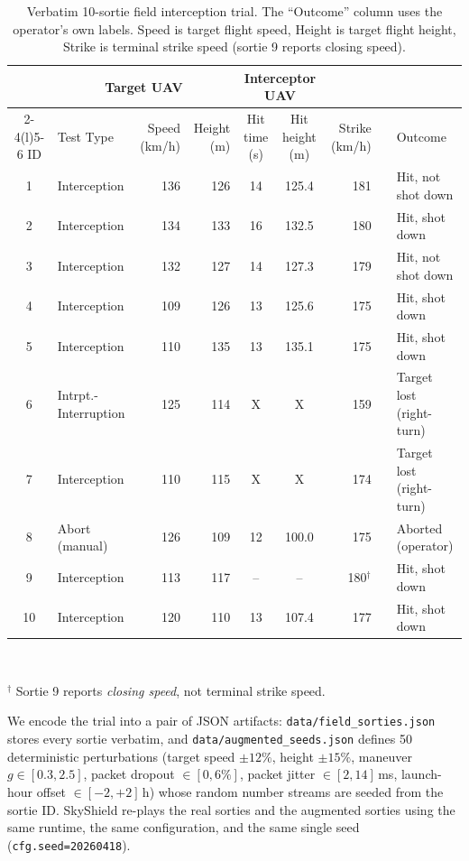 \documentclass[conference]{IEEEtran}
\begin{document}
\begin{table}[t]
\centering
\caption{Verbatim 10-sortie field interception trial.  The ``Outcome'' column
uses the operator's own labels.  Speed is target flight speed, Height is
target flight height, Strike is terminal strike speed (sortie 9 reports
closing speed).}
\label{tab:field}
\small
\begin{tabular}{cl rr cc rr l}
\toprule
 & \multicolumn{3}{c}{Target UAV} & \multicolumn{2}{c}{Interceptor UAV} & & &\\
\cmidrule(l){2-4}\cmidrule(l){5-6}
ID & Test Type & Speed (km/h) & Height (m) & Hit time (s) & Hit height (m)
   & Strike (km/h) & & Outcome\\
\midrule
 1 & Interception         & 136 & 126 & 14 & 125.4 & 181 & & Hit, not shot down\\
 2 & Interception         & 134 & 133 & 16 & 132.5 & 180 & & Hit, shot down\\
 3 & Interception         & 132 & 127 & 14 & 127.3 & 179 & & Hit, not shot down\\
 4 & Interception         & 109 & 126 & 13 & 125.6 & 175 & & Hit, shot down\\
 5 & Interception         & 110 & 135 & 13 & 135.1 & 175 & & Hit, shot down\\
 6 & Intrpt.-Interruption & 125 & 114 &  X &   X   & 159 & & Target lost (right-turn)\\
 7 & Interception         & 110 & 115 &  X &   X   & 174 & & Target lost (right-turn)\\
 8 & Abort (manual)       & 126 & 109 & 12 & 100.0 & 175 & & Aborted (operator)\\
 9 & Interception         & 113 & 117 & -- &  --   & 180$^\dagger$ & & Hit, shot down\\
10 & Interception         & 120 & 110 & 13 & 107.4 & 177 & & Hit, shot down\\
\bottomrule
\end{tabular}
\\[2pt]\raggedright $^\dagger$ Sortie 9 reports \emph{closing speed}, not
terminal strike speed.
\end{table}

We encode the trial into a pair of JSON artifacts:
\texttt{data/field\_sorties.json} stores every sortie verbatim, and
\texttt{data/augmented\_seeds.json} defines 50 deterministic perturbations
(target speed $\pm 12\%$, height $\pm 15\%$, maneuver $g \in [0.3,2.5]$,
packet dropout $\in [0,6\%]$, packet jitter $\in [2,14]$\,ms, launch-hour
offset $\in [-2,+2]$\,h) whose random number streams are seeded from the
sortie ID.  SkyShield re-plays the real sorties and the augmented sorties
using the same runtime, the same configuration, and the same single seed
(\texttt{cfg.seed=20260418}).
\end{document}
